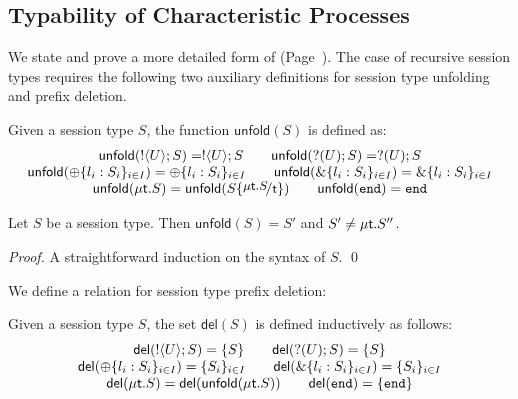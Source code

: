 

\subsection{Typability of Characteristic Processes}
\newcommand{\delete}[1]{\mathsf{del}(#1)}
\newcommand{\unfold}[1]{\mathsf{unfold}(#1)}



\noi We state and prove a more detailed form of  (Page~\pageref{p:inhabit}).
The case of recursive session types requires the following two auxiliary definitions for session type unfolding and prefix deletion.
\begin{definition}
	Given a session type $S$, the function $\unfold{S}$ is defined as:
	\[
	\begin{array}{c}
		\unfold{\btout{U} S} = \btout{U} S
		\qquad
		\unfold{\btinp{U} S} = \btinp{U} S
		\\
		\unfold{\btsel{l_i: S_i}_{i \in I}} = \btsel{l_i: S_i}_{i \in I}
		\qquad
		\unfold{\btbra{l_i: S_i}_{i \in I}} = \btbra{l_i: S_i}_{i \in I}
		\\
				\unfold{\trec{t}{S}} = \unfold{S \subst{\trec{t}{S}}{\tvar{t}}  }
		\qquad
		\unfold{\tinact} = \tinact
		\end{array}
	\]
\end{definition}

\begin{lemma}
	Let $S$ be a session type. Then $\unfold{S} = S'$ and
	$S' \not= \mu\mathsf{t}.S''$.
\end{lemma}

\begin{proof}
	A straightforward induction on the syntax of $S$. \qed
\end{proof}

We define a relation for session type prefix deletion:
\begin{definition}
	Given a session type $S$, the set $\delete{S}$ is defined inductively as follows:
	\[
	\begin{array}{c}
		\delete{\btout{U} S} = \set{S}
		\qquad 
		\delete{\btinp{U} S} = \set{S}
		\\
		\delete{\btsel{l_i: S_i}_{i \in I}} = \set{S_i}_{i \in I}
		\qquad
		\delete{\btbra{l_i: S_i}_{i \in I}} = \set{S_i}_{i \in I}
		\\
				\delete{\trec{t}{S}} = \delete{\unfold{\trec{t}{S}}}
\qquad
		\delete{\tinact} = \set{\tinact}
	\end{array}
	\]
\end{definition}

